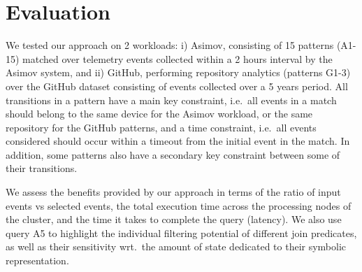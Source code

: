 \section{Evaluation}




We tested our approach on 2 workloads:
i) Asimov, consisting of 15 patterns (A1-15) matched over telemetry events
collected within a 2 hours interval by the Asimov system, and 
ii) GitHub, performing repository analytics (patterns G1-3) over the GitHub
dataset consisting of events collected over a 5 years period.
All transitions in a pattern have a main key constraint, i.e.\ all events in a
match should belong to the same device for the Asimov workload, or the same
repository for the GitHub patterns, and a time constraint, i.e.\ all events 
considered should occur within a timeout from the initial event in the match.
In addition, some patterns also have a secondary key constraint between some of
their transitions.

We assess the benefits provided by our approach in terms of 
the ratio of input events vs selected events, 
the total execution time across the processing nodes of the cluster,
and the time it takes to complete the query (latency).
We also use query A5 to highlight the individual filtering potential
of different join predicates, as well as their sensitivity wrt.\ the amount of
state dedicated to their symbolic representation.

